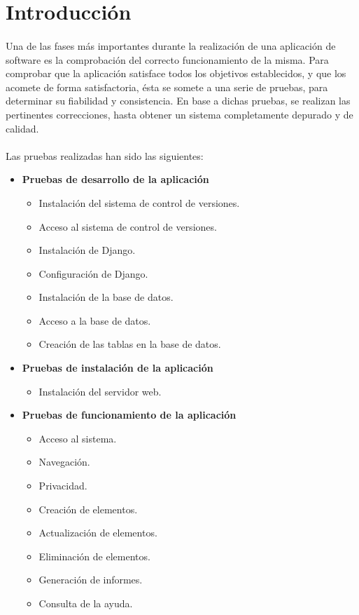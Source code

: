 \section{Introducción}

  \paragraph{}Una de las fases más importantes durante la realización de una
  aplicación de software es la comprobación del correcto funcionamiento de la
  misma. Para comprobar que la aplicación satisface todos los objetivos
  establecidos, y que los acomete de forma satisfactoria, ésta se somete a una
  serie de pruebas, para determinar su fiabilidad y consistencia. En base a
  dichas pruebas, se realizan las pertinentes correcciones, hasta obtener un
  sistema completamente depurado y de calidad.

 \paragraph{}Las pruebas realizadas han sido las siguientes:

 \begin{itemize}

  \item \textbf{Pruebas de desarrollo de la aplicación}
  \begin{itemize}
   \item Instalación del sistema de control de versiones.
   \item Acceso al sistema de control de versiones.
   \item Instalación de Django.
   \item Configuración de Django.
   \item Instalación de la base de datos.
   \item Acceso a la base de datos.
   \item Creación de las tablas en la base de datos.
  \end{itemize}

  \item \textbf{Pruebas de instalación de la aplicación}
  \begin{itemize}
   \item Instalación del servidor web.
  \end{itemize}

  \item \textbf{Pruebas de funcionamiento de la aplicación}
  \begin{itemize}
   \item Acceso al sistema.
   \item Navegación.
   \item Privacidad.
   \item Creación de elementos.
   \item Actualización de elementos.
   \item Eliminación de elementos.
   \item Generación de informes.
   \item Consulta de la ayuda.
  \end{itemize}

 \end{itemize}
